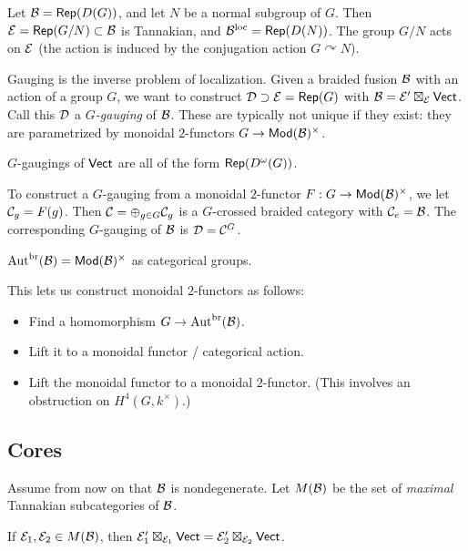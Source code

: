 \documentclass{amsart}
\begin{document}
\begin{ex}
  Let $\mathcal{B} = \operatorname{\mathsf{Rep}}(D(G))$, and let $N$ be a normal subgroup of $G$.
  Then $\mathcal{E} = \operatorname{\mathsf{Rep}}(G / N) \subset \mathcal{B}$ is Tannakian, and $\mathcal{B}^{\mathrm{loc}} = \operatorname{\mathsf{Rep}}(D(N))$.
  The group $G / N$ acts on $\mathcal{E}$ (the action is induced by the conjugation action $G \curvearrowright N$).
\end{ex}

Gauging is the inverse problem of localization.
Given a braided fusion $\mathcal{B}$ with an action of a group $G$, we want to construct $\mathcal{D} \supset \mathcal{E} = \operatorname{\mathsf{Rep}}(G)$ with $\mathcal{B} = \mathcal{E}' \boxtimes_{\mathcal{E}} \mathsf{Vect}$.
Call this $\mathcal{D}$ a \emph{$G$-gauging} of $\mathcal{B}$.
These are typically not unique if they exist: they are parametrized by monoidal $2$-functors $G \to \mathsf{Mod}(\mathcal{B})^\times$.

\begin{ex}
  $G$-gaugings of $\mathsf{Vect}$ are all of the form $\operatorname{\mathsf{Rep}}(D^\omega(G))$.
\end{ex}

To construct a $G$-gauging from a monoidal $2$-functor $F: G \to \mathsf{Mod}(\mathcal{B})^\times$, we let $\mathcal{C}_g = F(g)$.
Then $\mathcal{C} = \oplus_{g \in G} \mathcal{C}_g$ is a $G$-crossed braided category with $\mathcal{C}_e = \mathcal{B}$.
The corresponding $G$-gauging of $\mathcal{B}$ is $\mathcal{D} = \mathcal{C}^G$.

\begin{thm}
  $\operatorname{Aut}^{\mathrm{br}}(\mathcal{B}) = \mathsf{Mod}(\mathcal{B})^\times$ as categorical groups.
\end{thm}

This lets us construct monoidal $2$-functors as follows:
\begin{itemize}
  \item Find a homomorphism $G \to \operatorname{Aut}^{\mathrm{br}}(\mathcal{B})$.
  \item Lift it to a monoidal functor / categorical action.
  \item Lift the monoidal functor to a monoidal $2$-functor.
    (This involves an obstruction on $H^4(G, k^\times)$.)
\end{itemize}

\subsection{Cores}

Assume from now on that $\mathcal{B}$ is nondegenerate.
Let $M(\mathcal{B})$ be the set of \emph{maximal} Tannakian subcategories of $\mathcal{B}$.

\begin{thm}
  If $\mathcal{E}_1, \mathcal{E}_2 \in M(\mathcal{B})$, then $\mathcal{E}_1' \boxtimes_{\mathcal{E}_1} \mathsf{Vect} = \mathcal{E}_2' \boxtimes_{\mathcal{E}_2} \mathsf{Vect}$.
\end{thm}
\end{document}
